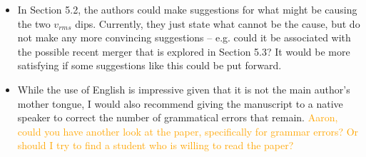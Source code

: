 \documentclass[10pt,a4paper]{article}
\newcommand{\Aaron}[1]{\textcolor{Orange}{#1}}
\begin{document}
\begin{itemize}
\item In Section 5.2, the authors could make suggestions for what might be causing the two
$v_{rms}$ dips. Currently, they just state what cannot be the cause, but do not make any
more convincing suggestions – e.g. could it be associated with the possible recent
merger that is explored in Section 5.3? It would be more satisfying if some
suggestions like this could be put forward.

\item While the use of English is impressive given that it is not the main author's mother
tongue, I would also recommend giving the manuscript to a native speaker to correct
the number of grammatical errors that remain. \Aaron{Aaron, could you have another look at the paper, specifically for grammar errors? Or should I try to find a student who is willing to read the paper?}

\end{itemize}
\end{document}
